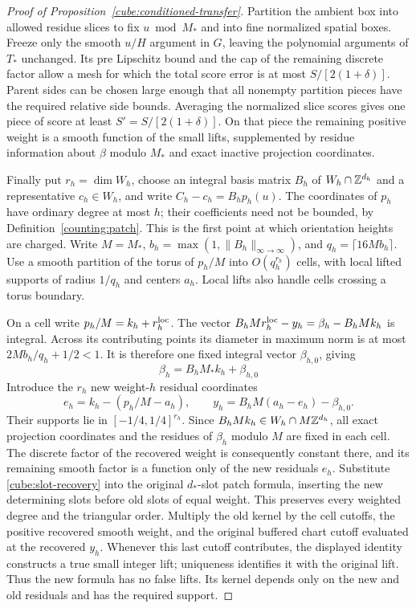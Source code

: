 \begin{proof}[Proof of Proposition~\ref{cube:conditioned-transfer}]
Partition the ambient box into allowed residue slices to fix
$u\bmod M_*$ and into fine normalized spatial boxes.  Freeze only
the smooth $u/H$ argument in $G$, leaving the polynomial arguments
of $T_*$ unchanged.  Its pre Lipschitz bound and the cap of the
remaining discrete factor allow a mesh for which the total score
error is at most $S/[2(1+\delta)]$.  Parent sides can be chosen
large enough that all nonempty partition pieces have the required
relative side bounds.  Averaging the normalized slice scores gives
one piece of score at least $S'=S/[2(1+\delta)]$.  On that piece
the remaining positive
weight is a smooth function of the small lifts, supplemented by
residue information about $\beta$ modulo $M_*$ and exact inactive
projection coordinates.

Finally put $r_h=\dim W_h$, choose an integral basis matrix $B_h$
of $W_h\cap\mathbb Z^{d_h}$ and a representative $c_h\in W_h$, and write
$C_h-c_h=B_hp_h(u)$.  The coordinates of $p_h$ have ordinary degree
at most $h$; their coefficients need not be bounded, by
Definition~\ref{counting:patch}.  This is the first point at which
orientation heights are charged.  Write $M=M_*$,
$b_h=\max(1,\|B_h\|_{\infty\to\infty})$, and
$q_h=\lceil16Mb_h\rceil$.  Use a smooth partition of the torus of
$p_h/M$ into $O(q_h^{r_h})$ cells, with local lifted supports of
radius $1/q_h$ and centers $a_h$.  Local lifts also handle cells
crossing a torus boundary.

On a cell write $p_h/M=k_h+r_h^{\rm loc}$.  The vector
$B_hMr_h^{\rm loc}-y_h=\beta_h-B_hMk_h$ is integral.
Across its contributing points its diameter in maximum norm is at
most $2Mb_h/q_h+1/2<1$.  It is therefore one fixed integral vector
$\beta_{h,0}$, giving
\begin{equation}
                     \beta_h=B_hM_*k_h+\beta_{h,0}
 \label{cube:slot-recovery}
\end{equation}
Introduce the $r_h$ new weight-$h$ residual coordinates
\[
 e_h=k_h-(p_h/M-a_h),\qquad
 y_h=B_hM(a_h-e_h)-\beta_{h,0}.
\]
Their supports lie in $[-1/4,1/4]^{r_h}$.  Since
$B_hMk_h\in W_h\cap M\mathbb Z^{d_h}$, all exact projection coordinates
and the residues of $\beta_h$ modulo $M$ are fixed in each cell.
The discrete factor of the recovered weight is consequently
constant there, and its remaining smooth factor is a function only
of the new residuals $e_h$.  Substitute
\eqref{cube:slot-recovery} into the original $d_*$-slot patch
formula, inserting the new determining slots before old slots of
equal weight.  This preserves every weighted degree and the
triangular order.  Multiply the old kernel by the cell cutoffs,
the positive recovered smooth weight, and the original buffered
chart cutoff evaluated at the recovered $y_h$.  Whenever this last
cutoff contributes, the displayed identity constructs a true small
integer lift; uniqueness identifies it with the original lift.
Thus the new formula has no false lifts.  Its kernel depends only
on the new and old residuals and has the required support.


\end{proof}
